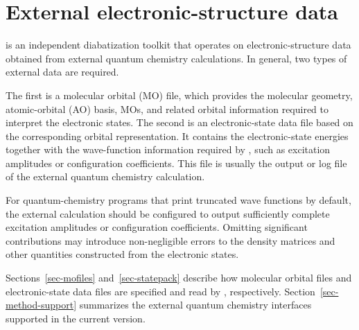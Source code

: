 \section{External electronic-structure data}

\progname{} is an independent diabatization toolkit that operates on electronic-structure data obtained from external quantum chemistry calculations. In general, two types of external data are required.

The first is a molecular orbital (MO) file, which provides the molecular geometry, atomic-orbital (AO) basis, MOs, and related orbital information required to interpret the electronic states.
The second is an electronic-state data file based on the corresponding orbital representation.
It contains the electronic-state energies together with the wave-function information required by \progname{}, such as excitation amplitudes or configuration coefficients.
This file is usually the output or log file of the external quantum chemistry calculation.

For quantum-chemistry programs that print truncated wave functions by default, the external calculation should be configured to output sufficiently complete excitation amplitudes or configuration coefficients. Omitting significant contributions may introduce non-negligible errors to the density matrices and other quantities constructed from the electronic states.

Sections~\ref{sec-mofiles} and~\ref{sec-statepack} describe how molecular orbital files and electronic-state data files are specified and read by \progname{}, respectively. Section~\ref{sec-method-support} summarizes the external quantum chemistry interfaces supported in the current version.
